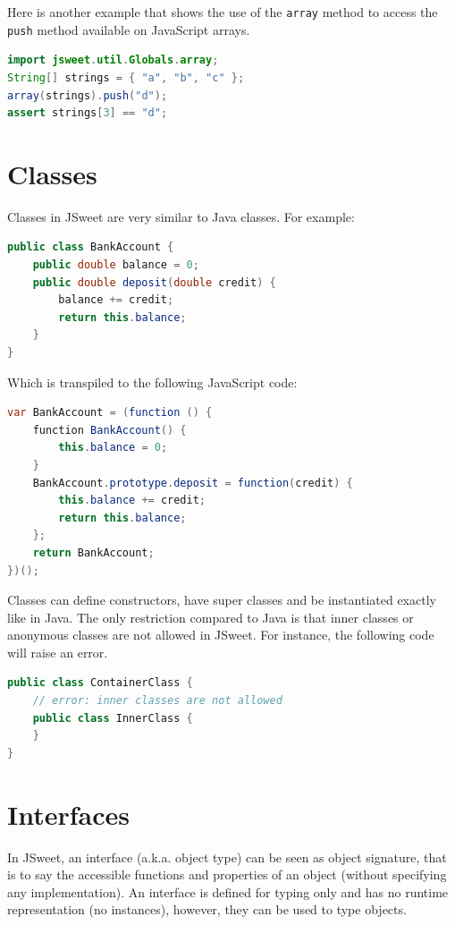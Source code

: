 \documentclass[a4paper]{report}
\begin{document}
\noindent
Here is another example that shows the use of the \texttt{array} method to access the \texttt{push} method available on JavaScript arrays.

\begin{lstlisting}[language=Java]
import jsweet.util.Globals.array;
String[] strings = { "a", "b", "c" };
array(strings).push("d");
assert strings[3] == "d";
\end{lstlisting}

\section{Classes}

Classes in JSweet are very similar to Java classes. For example:

\begin{lstlisting}[language=Java]
public class BankAccount {  
    public double balance = 0;  
    public double deposit(double credit) {  
        balance += credit;  
        return this.balance;  
    }  
}  
\end{lstlisting}

\noindent
Which is transpiled to the following JavaScript code:

\begin{lstlisting}[language=Java]
var BankAccount = (function () {  
    function BankAccount() {  
        this.balance = 0;  
    }  
    BankAccount.prototype.deposit = function(credit) {  
        this.balance += credit;  
        return this.balance;  
    };  
    return BankAccount;  
})();
\end{lstlisting}

Classes can define constructors, have super classes and be instantiated exactly like in Java. The only restriction compared to Java is that inner classes or anonymous classes are not allowed in JSweet. For instance, the following code will raise an error.

\begin{lstlisting}[language=Java]
public class ContainerClass {
	// error: inner classes are not allowed
	public class InnerClass {
	}
}
\end{lstlisting}

\section{Interfaces}

In JSweet, an interface (a.k.a. object type) can be seen as object signature, that is to say the accessible functions and properties of an object (without specifying any implementation). An interface is defined for typing only and has no runtime representation (no instances), however, they can be used to type objects.
\end{document}
